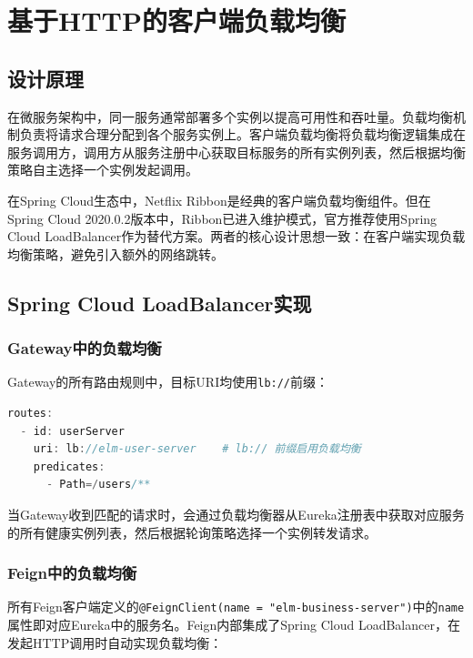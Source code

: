 
\chapter{基于HTTP的客户端负载均衡}

\section{设计原理}

在微服务架构中，同一服务通常部署多个实例以提高可用性和吞吐量。负载均衡机制负责将请求合理分配到各个服务实例上。客户端负载均衡将负载均衡逻辑集成在服务调用方，调用方从服务注册中心获取目标服务的所有实例列表，然后根据均衡策略自主选择一个实例发起调用。

在Spring Cloud生态中，Netflix Ribbon是经典的客户端负载均衡组件。但在Spring Cloud 2020.0.2版本中，Ribbon已进入维护模式，官方推荐使用Spring Cloud LoadBalancer作为替代方案。两者的核心设计思想一致：在客户端实现负载均衡策略，避免引入额外的网络跳转。

\section{Spring Cloud LoadBalancer实现}

\subsection{Gateway中的负载均衡}

Gateway的所有路由规则中，目标URI均使用\verb|lb://|前缀：

\begin{lstlisting}[language=Java, caption=Gateway路由中的负载均衡]
routes:
  - id: userServer
    uri: lb://elm-user-server    # lb:// 前缀启用负载均衡
    predicates:
      - Path=/users/**
\end{lstlisting}

当Gateway收到匹配的请求时，会通过负载均衡器从Eureka注册表中获取对应服务的所有健康实例列表，然后根据轮询策略选择一个实例转发请求。

\subsection{Feign中的负载均衡}

所有Feign客户端定义的\verb|@FeignClient(name = "elm-business-server")|中的\verb|name|属性即对应Eureka中的服务名。Feign内部集成了Spring Cloud LoadBalancer，在发起HTTP调用时自动实现负载均衡：

